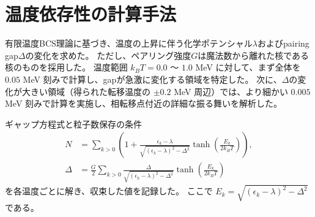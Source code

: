 \documentclass[a4paper]{jsreport}
\begin{document}
  \section{温度依存性の計算手法}
  有限温度BCS理論に基づき、温度の上昇に伴う化学ポテンシャル\(\lambda\)およびpairing gap\(\Delta\)の変化を求めた。
  ただし、ペアリング強度\(G\)は魔法数から離れた核である核のものを採用した。 
  温度範囲 \(k_B T = 0.0\) 〜 \(1.0\) MeV に対して、まず全体を \(0.05\) MeV 刻みで計算し、gapが急激に変化する領域を特定した。  
  次に、\(\Delta\)の変化が大きい領域（得られた転移温度の \(\pm 0.2\) MeV 周辺）では、より細かい \(0.005\) MeV 刻みで計算を実施し、相転移点付近の詳細な振る舞いを解析した。  

  ギャップ方程式と粒子数保存の条件  
  \begin{align}
      N &= \sum_{k>0} \left( 1 + \frac{\epsilon_k - \lambda}{\sqrt{(\epsilon_k - \lambda)^2 - \Delta^2}} \tanh \left(\frac{E_k}{2k_B T} \right) \right), \\
      \Delta &= \frac{G}{2} \sum_{k>0} \frac{\Delta}{\sqrt{(\epsilon_k - \lambda)^2 - \Delta^2}} \tanh \left(\frac{E_k}{2k_B T} \right)
  \end{align}
  を各温度ごとに解き、収束した値を記録した。  
  ここで \(E_k = \sqrt{(\epsilon_k - \lambda)^2 - \Delta^2}\) である。  
\end{document}
